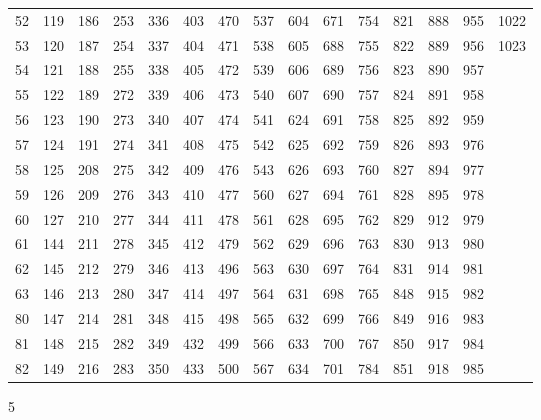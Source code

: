\documentclass{assignment}
\begin{document}
\begin{tabular}{r r r r r r r r r r r r r r r}
52 & 119 & 186 & 253 & 336 & 403 & 470 & 537 & 604 & 671 & 754 & 821 & 888 & 955 & 1022 \\
53 & 120 & 187 & 254 & 337 & 404 & 471 & 538 & 605 & 688 & 755 & 822 & 889 & 956 & 1023 \\
54 & 121 & 188 & 255 & 338 & 405 & 472 & 539 & 606 & 689 & 756 & 823 & 890 & 957 \\
55 & 122 & 189 & 272 & 339 & 406 & 473 & 540 & 607 & 690 & 757 & 824 & 891 & 958 \\
56 & 123 & 190 & 273 & 340 & 407 & 474 & 541 & 624 & 691 & 758 & 825 & 892 & 959 \\
57 & 124 & 191 & 274 & 341 & 408 & 475 & 542 & 625 & 692 & 759 & 826 & 893 & 976 \\
58 & 125 & 208 & 275 & 342 & 409 & 476 & 543 & 626 & 693 & 760 & 827 & 894 & 977 \\
59 & 126 & 209 & 276 & 343 & 410 & 477 & 560 & 627 & 694 & 761 & 828 & 895 & 978 \\
60 & 127 & 210 & 277 & 344 & 411 & 478 & 561 & 628 & 695 & 762 & 829 & 912 & 979 \\
61 & 144 & 211 & 278 & 345 & 412 & 479 & 562 & 629 & 696 & 763 & 830 & 913 & 980 \\
62 & 145 & 212 & 279 & 346 & 413 & 496 & 563 & 630 & 697 & 764 & 831 & 914 & 981 \\
63 & 146 & 213 & 280 & 347 & 414 & 497 & 564 & 631 & 698 & 765 & 848 & 915 & 982 \\
80 & 147 & 214 & 281 & 348 & 415 & 498 & 565 & 632 & 699 & 766 & 849 & 916 & 983 \\
81 & 148 & 215 & 282 & 349 & 432 & 499 & 566 & 633 & 700 & 767 & 850 & 917 & 984 \\
82 & 149 & 216 & 283 & 350 & 433 & 500 & 567 & 634 & 701 & 784 & 851 & 918 & 985 \\
\end{tabular}
\newpage


5\\
\\
\end{document}
